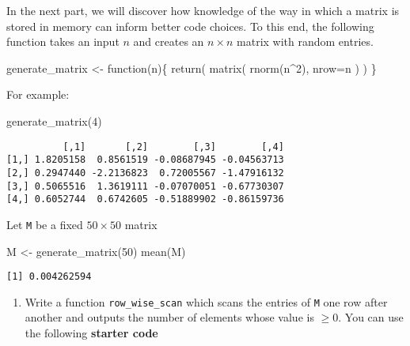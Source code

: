 \documentclass[
  letterpaper,
  DIV=11,
  numbers=noendperiod]{scrartcl}
\newenvironment{Shaded}{\begin{snugshade}}{\end{snugshade}}
\newcommand{\AttributeTok}[1]{\textcolor[rgb]{0.40,0.45,0.13}{#1}}
\newcommand{\ControlFlowTok}[1]{\textcolor[rgb]{0.00,0.23,0.31}{#1}}
\newcommand{\DecValTok}[1]{\textcolor[rgb]{0.68,0.00,0.00}{#1}}
\newcommand{\FunctionTok}[1]{\textcolor[rgb]{0.28,0.35,0.67}{#1}}
\newcommand{\NormalTok}[1]{\textcolor[rgb]{0.00,0.23,0.31}{#1}}
\newcommand{\OtherTok}[1]{\textcolor[rgb]{0.00,0.23,0.31}{#1}}
\newcommand{\SpecialCharTok}[1]{\textcolor[rgb]{0.37,0.37,0.37}{#1}}
\providecommand{\tightlist}{%
  \setlength{\itemsep}{0pt}\setlength{\parskip}{0pt}}\usepackage{longtable,booktabs,array}
\begin{document}
In the next part, we will discover how knowledge of the way in which a
matrix is stored in memory can inform better code choices. To this end,
the following function takes an input \(n\) and creates an
\(n \times n\) matrix with random entries.

\begin{Shaded}
\begin{Highlighting}[]
\NormalTok{generate\_matrix }\OtherTok{\textless{}{-}} \ControlFlowTok{function}\NormalTok{(n)\{}
    \FunctionTok{return}\NormalTok{(}
        \FunctionTok{matrix}\NormalTok{(}
            \FunctionTok{rnorm}\NormalTok{(n}\SpecialCharTok{\^{}}\DecValTok{2}\NormalTok{),}
            \AttributeTok{nrow=}\NormalTok{n}
\NormalTok{        )}
\NormalTok{    )}
\NormalTok{\}}
\end{Highlighting}
\end{Shaded}

For example:

\begin{Shaded}
\begin{Highlighting}[]
\FunctionTok{generate\_matrix}\NormalTok{(}\DecValTok{4}\NormalTok{)}
\end{Highlighting}
\end{Shaded}

\begin{verbatim}
          [,1]       [,2]        [,3]        [,4]
[1,] 1.8205158  0.8561519 -0.08687945 -0.04563713
[2,] 0.2947440 -2.2136823  0.72005567 -1.47916132
[3,] 0.5065516  1.3619111 -0.07070051 -0.67730307
[4,] 0.6052744  0.6742605 -0.51889902 -0.86159736
\end{verbatim}

Let \texttt{M} be a fixed \(50 \times 50\) matrix

\begin{Shaded}
\begin{Highlighting}[]
\NormalTok{M }\OtherTok{\textless{}{-}} \FunctionTok{generate\_matrix}\NormalTok{(}\DecValTok{50}\NormalTok{)}
\FunctionTok{mean}\NormalTok{(M)}
\end{Highlighting}
\end{Shaded}

\begin{verbatim}
[1] 0.004262594
\end{verbatim}

\begin{enumerate}
\def\labelenumi{\arabic{enumi}.}
\setcounter{enumi}{1}
\tightlist
\item
  Write a function \texttt{row\_wise\_scan} which scans the entries of
  \texttt{M} one row after another and outputs the number of elements
  whose value is \(\ge 0\). You can use the following \textbf{starter
  code}
\end{enumerate}
\end{document}
